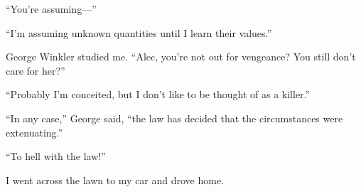 {“You’re assuming—”

“I’m assuming unknown quantities until I learn their values.”

George Winkler studied me. “Alec, you’re not out for vengeance? You still don’t care for her?”

“Probably I’m conceited, but I don’t like to be thought of as a killer.”

“In any case,” George said, “the law has decided that the circumstances were extenuating.”

“To hell with the law!”

I went across the lawn to my car and drove home.

}

\vspace{2\nbs}
\clearpage
\thispagestyle{empty}


